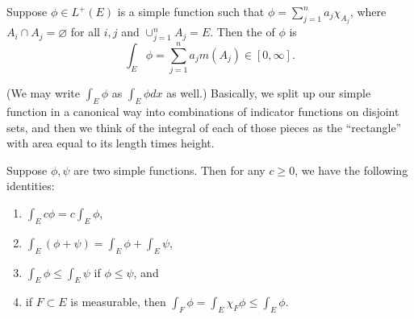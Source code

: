 \begin{definition}
Suppose $\phi \in L^+(E)$ is a simple function such that $\phi = \sum_{j=1}^n a_j \chi_{A_j}$, where $A_i \cap A_j = \varnothing$ for all $i, j$ and $\cup_{j=1}^n A_j = E$. Then the  of $\phi$ is 
\[
    \int_E \phi = \sum_{j=1}^n a_j m(A_j) \in [0, \infty].
\]
\end{definition}

(We may write $\int_E \phi$ as $\int_E \phi dx$ as well.) Basically, we split up our simple function in a canonical way into combinations of indicator functions on disjoint sets, and then we think of the integral of each of those pieces as the ``rectangle'' with area equal to its length times height.

\begin{theorem}
Suppose $\phi, \psi$ are two simple functions. Then for any $c \ge 0$, we have the following identities:
\begin{enumerate}
\item $\int_E c\phi = c \int_E \phi$,
\item $\int_E (\phi + \psi) = \int_E \phi + \int_E \psi$,
\item $\int_E \phi \le \int_E \psi$ if $\phi \le \psi$, and
\item if $F \subset E$ is measurable, then $\int_F \phi = \int_E \chi_F \phi \le \int_E \phi$.
\end{enumerate}
\end{theorem}
